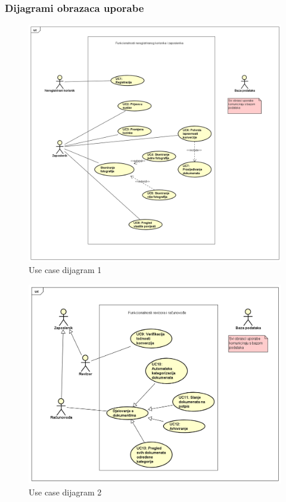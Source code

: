 					
				\subsubsection{Dijagrami obrazaca uporabe}
					
					
				\begin{figure}[H]
					\includegraphics[scale=0.5]{slike/dijagram_obrasca_uporabe_1.PNG} %
					\centering
					\caption{Use case dijagram 1}
					\label{fig:promjene}
				\end{figure}
				
				\begin{figure}[H]
					\includegraphics[scale=0.5]{slike/dijagram_obrasca_uporabe_2.PNG} %
					\centering
					\caption{Use case dijagram 2}
					\label{fig:promjene}
				\end{figure}		
				
